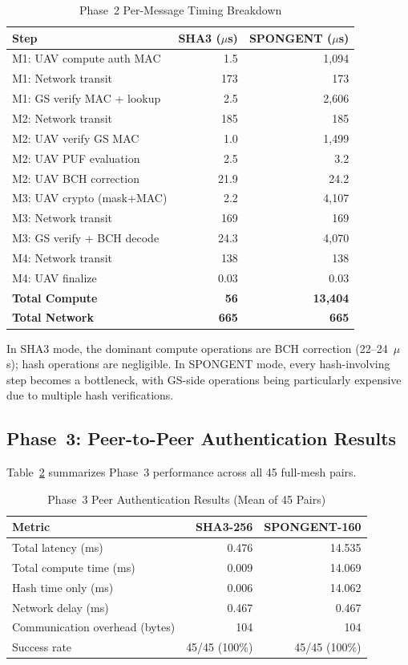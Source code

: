 \documentclass[11pt,a4paper]{article}
\begin{document}
\begin{table}[H]
\centering
\caption{Phase~2 Per-Message Timing Breakdown}
\label{tab:phase2_breakdown}
\begin{tabular}{@{}p{4.5cm}rr@{}}
\toprule
\textbf{Step} & \textbf{SHA3 ($\mu$s)} & \textbf{SPONGENT ($\mu$s)} \\
\midrule
M1: UAV compute auth MAC & 1.5 & 1,094 \\
M1: Network transit & 173 & 173 \\
M1: GS verify MAC + lookup & 2.5 & 2,606 \\
M2: Network transit & 185 & 185 \\
M2: UAV verify GS MAC & 1.0 & 1,499 \\
M2: UAV PUF evaluation & 2.5 & 3.2 \\
M2: UAV BCH correction & 21.9 & 24.2 \\
M3: UAV crypto (mask+MAC) & 2.2 & 4,107 \\
M3: Network transit & 169 & 169 \\
M3: GS verify + BCH decode & 24.3 & 4,070 \\
M4: Network transit & 138 & 138 \\
M4: UAV finalize & 0.03 & 0.03 \\
\midrule
\textbf{Total Compute} & \textbf{56} & \textbf{13,404} \\
\textbf{Total Network} & \textbf{665} & \textbf{665} \\
\bottomrule
\end{tabular}
\end{table}

In SHA3 mode, the dominant compute operations are BCH correction (22--24~$\mu$s); hash operations are negligible. In SPONGENT mode, every hash-involving step becomes a bottleneck, with GS-side operations being particularly expensive due to multiple hash verifications.

\subsection{Phase~3: Peer-to-Peer Authentication Results}

Table~\ref{tab:phase3_results} summarizes Phase~3 performance across all 45 full-mesh pairs.

\begin{table}[H]
\centering
\caption{Phase~3 Peer Authentication Results (Mean of 45 Pairs)}
\label{tab:phase3_results}
\begin{tabular}{@{}lrr@{}}
\toprule
\textbf{Metric} & \textbf{SHA3-256} & \textbf{SPONGENT-160} \\
\midrule
Total latency (ms) & 0.476 & 14.535 \\
Total compute time (ms) & 0.009 & 14.069 \\
Hash time only (ms) & 0.006 & 14.062 \\
Network delay (ms) & 0.467 & 0.467 \\
Communication overhead (bytes) & 104 & 104 \\
Success rate & 45/45 (100\%) & 45/45 (100\%) \\
\bottomrule
\end{tabular}
\end{table}
\end{document}
